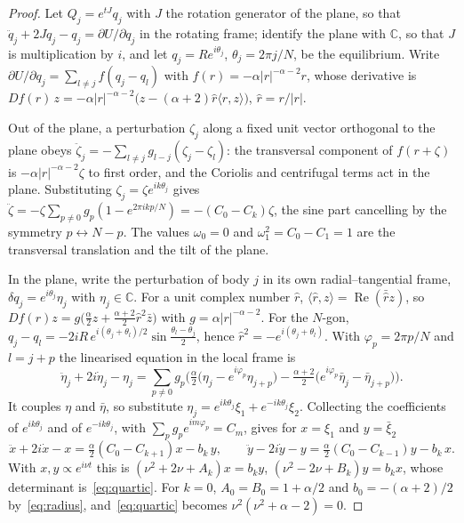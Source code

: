 \documentclass[11pt]{amsart}
\theoremstyle{definition}
\newcommand{\C}{\mathbb{C}}
\begin{document}
\begin{proof}
Let $Q_j=e^{tJ}q_j$ with $J$ the rotation generator of the plane, so that $\ddot q_j+2J\dot q_j-q_j=\partial U/\partial q_j$ in the rotating frame; identify the plane with $\C$, so that $J$ is multiplication by $i$, and let $q_j=Re^{i\theta_j}$, $\theta_j=2\pi j/N$, be the equilibrium. Write $\partial U/\partial q_j=\sum_{l\ne j}f(q_j-q_l)$ with $f(r)=-\alpha|r|^{-\alpha-2}r$, whose derivative is $Df(r)\,z=-\alpha|r|^{-\alpha-2}\big(z-(\alpha+2)\hat r\langle\hat r,z\rangle\big)$, $\hat r=r/|r|$.

Out of the plane, a perturbation $\zeta_j$ along a fixed unit vector orthogonal to the plane obeys $\ddot\zeta_j=-\sum_{l\ne j}g_{l-j}(\zeta_j-\zeta_l)$: the transversal component of $f(r+\zeta)$ is $-\alpha|r|^{-\alpha-2}\zeta$ to first order, and the Coriolis and centrifugal terms act in the plane. Substituting $\zeta_j=\zeta e^{ik\theta_j}$ gives $\ddot\zeta=-\zeta\sum_{p\ne0}g_p(1-e^{2\pi ikp/N})=-(C_0-C_k)\zeta$, the sine part cancelling by the symmetry $p\leftrightarrow N-p$. The values $\omega_0=0$ and $\omega_1^2=C_0-C_1=1$ are the transversal translation and the tilt of the plane.

In the plane, write the perturbation of body $j$ in its own radial--tangential frame, $\delta q_j=e^{i\theta_j}\eta_j$ with $\eta_j\in\C$. For a unit complex number $\hat r$, $\langle\hat r,z\rangle=\operatorname{Re}(\bar{\hat r}z)$, so $Df(r)z=g\big(\tfrac\alpha2 z+\tfrac{\alpha+2}2\hat r^2\bar z\big)$ with $g=\alpha|r|^{-\alpha-2}$. For the $N$-gon, $q_j-q_l=-2iR\,e^{i(\theta_j+\theta_l)/2}\sin\frac{\theta_l-\theta_j}2$, hence $\hat r^2=-e^{i(\theta_j+\theta_l)}$. With $\varphi_p=2\pi p/N$ and $l=j+p$ the linearised equation in the local frame is
\[
\ddot\eta_j+2i\dot\eta_j-\eta_j=\sum_{p\ne0}g_p\Big(\tfrac\alpha2\big(\eta_j-e^{i\varphi_p}\eta_{j+p}\big)-\tfrac{\alpha+2}2\big(e^{i\varphi_p}\bar\eta_j-\bar\eta_{j+p}\big)\Big).
\]
It couples $\eta$ and $\bar\eta$, so substitute $\eta_j=e^{ik\theta_j}\xi_1+e^{-ik\theta_j}\xi_2$. Collecting the coefficients of $e^{ik\theta_j}$ and of $e^{-ik\theta_j}$, with $\sum_pg_pe^{im\varphi_p}=C_m$, gives for $x=\xi_1$ and $y=\bar\xi_2$
\[
\ddot x+2i\dot x-x=\tfrac\alpha2(C_0-C_{k+1})x-b_k\,y,\qquad \ddot y-2i\dot y-y=\tfrac\alpha2(C_0-C_{k-1})y-b_k\,x .
\]
With $x,y\propto e^{i\nu t}$ this is $(\nu^2+2\nu+A_k)x=b_ky$, $(\nu^2-2\nu+B_k)y=b_kx$, whose determinant is~\eqref{eq:quartic}. For $k=0$, $A_0=B_0=1+\alpha/2$ and $b_0=-(\alpha+2)/2$ by~\eqref{eq:radius}, and~\eqref{eq:quartic} becomes $\nu^2(\nu^2+\alpha-2)=0$.
\end{proof}
\end{document}
